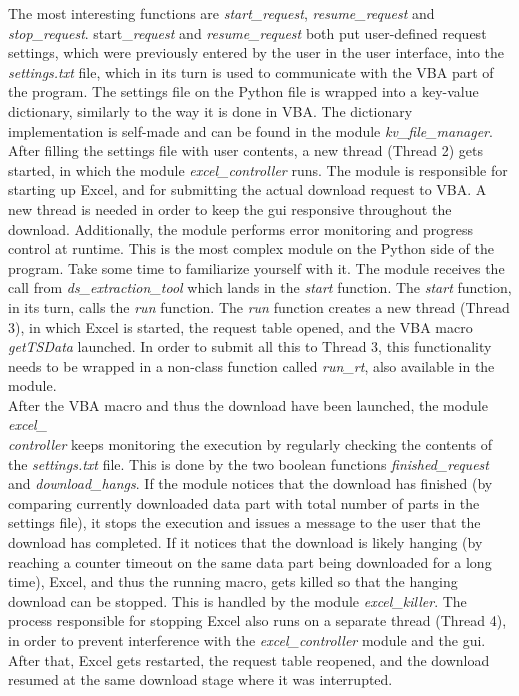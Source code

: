 The most interesting functions are \textit{start\_request}, \textit{resume\_request} and \textit{stop\_request}. start\_\textit{request} and \textit{resume\_request} both put user-defined request settings, which were previously entered by the user in the user interface, into the \textit{settings.txt} file, which in its turn is used to communicate with the VBA part of the program. The settings file on the Python file is wrapped into a key-value dictionary, similarly to the way it is done in VBA. The dictionary implementation is self-made and can be found in the module \textit{kv\_file\_manager}.  \\

After filling the settings file with user contents, a new thread (Thread 2) gets started, in which the module \textit{excel\_controller} runs. The module is responsible for starting up Excel, and for submitting the actual download request to VBA. A new thread is needed in order to keep the gui responsive throughout the download. Additionally, the module performs error monitoring and progress control at runtime. This is the most complex module on the Python side of the program. Take some time to familiarize yourself with it. The module receives the call from \textit{ds\_extraction\_tool} which lands in the \textit{start} function. The \textit{start} function, in its turn, calls the \textit{run} function. The \textit{run} function creates a new thread (Thread 3), in which Excel is started, the request table opened, and the VBA macro \textit{getTSData} launched. In order to submit all this to Thread 3, this functionality needs to be wrapped in a non-class function called \textit{run\_rt}, also available in the module. \\

After the VBA macro and thus the download have been launched, the module \textit{excel\_ \\ controller} keeps monitoring the execution by regularly checking the contents of the \textit{settings.txt} file. This is done by the two boolean functions \textit{finished\_request} and \textit{download\_hangs}. If the module notices that the download has finished (by comparing currently downloaded data part with total number of parts in the settings file), it stops the execution and issues a message to the user that the download has completed. If it notices that the download is likely hanging (by reaching a counter timeout on the same data part being downloaded for a long time), Excel, and thus the running macro, gets killed so that the hanging download can be stopped. This is handled by the module \textit{excel\_killer}. The process responsible for stopping Excel also runs on a separate thread (Thread 4), in order to prevent interference with the \textit{excel\_controller} module and the gui. After that, Excel gets restarted, the request table reopened, and the download resumed at the same download stage where it was interrupted. \\

